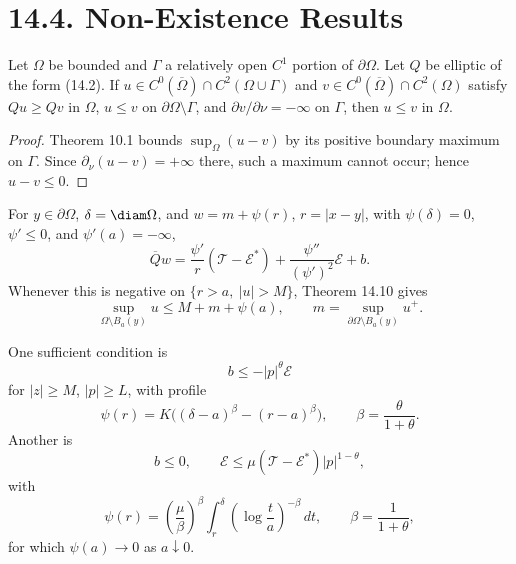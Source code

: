 \section*{14.4. Non-Existence Results}

\begin{theorem}
\label{gt14-boundary-gradient-14-10}
Let $\Omega$ be bounded and $\Gamma$ a relatively open $C^1$ portion of
$\partial\Omega$. Let $Q$ be elliptic of the form (14.2). If
$u\in C^0(\overline\Omega)\cap C^2(\Omega\cup\Gamma)$ and
$v\in C^0(\overline\Omega)\cap C^2(\Omega)$ satisfy
$Qu\geq Qv$ in $\Omega$, $u\leq v$ on
$\partial\Omega\setminus\Gamma$, and
$\partial v/\partial\nu=-\infty$ on $\Gamma$, then $u\leq v$ in $\Omega$.
\end{theorem}
\begin{proof}
\sketch Theorem 10.1 bounds $\sup_\Omega(u-v)$ by its positive boundary
maximum on $\Gamma$. Since
$\partial_\nu(u-v)=+\infty$ there, such a maximum cannot occur; hence
$u-v\leq0$.
\end{proof}

For $y\in\partial\Omega$, $\delta=\diam\Omega$, and
$w=m+\psi(r)$, $r=|x-y|$, with
$\psi(\delta)=0$, $\psi'\leq0$, and $\psi'(a)=-\infty$,
\begin{equation}
\overline Qw
=\frac{\psi'}r(\mathcal T-\mathcal E^*)
+\frac{\psi''}{(\psi')^2}\mathcal E+b.
\tag{14.62}
\end{equation}
Whenever this is negative on $\{r>a,\ |u|>M\}$, Theorem 14.10 gives
\begin{equation}
\sup_{\Omega\setminus B_a(y)}u\leq M+m+\psi(a),
\qquad
m=\sup_{\partial\Omega\setminus B_a(y)}u^+.
\tag{14.63}
\end{equation}

One sufficient condition is
\begin{equation}
b\leq-|p|^\theta\mathcal E
\tag{14.64}
\end{equation}
for $|z|\geq M$, $|p|\geq L$, with profile
\begin{equation}
\psi(r)=K\bigl((\delta-a)^\beta-(r-a)^\beta\bigr),
\qquad \beta=\frac{\theta}{1+\theta}.
\tag{14.65}
\end{equation}
Another is
\begin{equation}
b\leq0,\qquad
\mathcal E\leq\mu(\mathcal T-\mathcal E^*)|p|^{1-\theta},
\tag{14.66}
\end{equation}
with
\begin{equation}
\psi(r)=\left(\frac\mu\beta\right)^\beta
\int_r^\delta\left(\log\frac ta\right)^{-\beta}\,dt,
\qquad \beta=\frac1{1+\theta},
\tag{14.67}
\end{equation}
for which $\psi(a)\to0$ as $a\downarrow0$.

